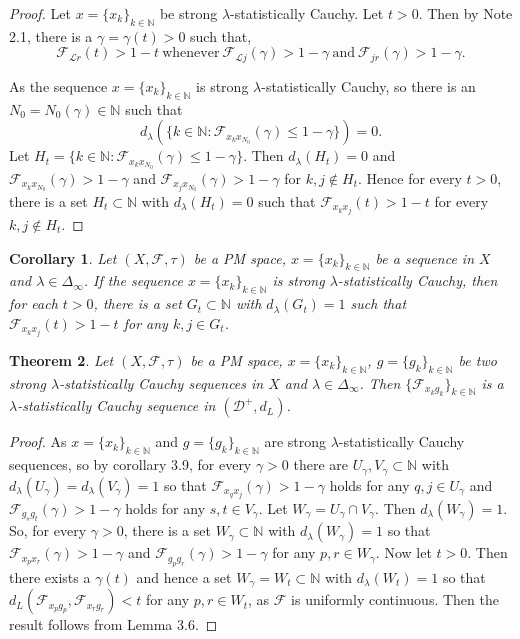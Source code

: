 \documentclass[reqno,b5paper]{amsart}
\theoremstyle{plain}
\newtheorem{thm}{Theorem}[section]
\newtheorem{cor}[thm]{Corollary}
\theoremstyle{definition}
\begin{document}
\begin{proof}
Let $x=\{x_k\}_{k \in \mathbb{N}}$ be strong
$\lambda$-statistically Cauchy. Let $t>0$. Then by Note 2.1, there
is a $\gamma=\gamma(t)>0$ such that,
$$\mathcal{F}_{\mathcal{L}r}(t)>1-t ~\text{whenever}~ \mathcal{F}_{\mathcal{L}j}(\gamma)>1-\gamma ~\text{and}~ \mathcal{F}_{jr}(\gamma)>1-\gamma.$$

As the sequence $x=\{x_k\}_{k \in \mathbb{N}}$ is strong
$\lambda$-statistically Cauchy, so there is an
$N_0=N_0(\gamma)\in\mathbb{N}$ such that
$$d_\lambda(\{k\in \mathbb{N}:\mathcal{F}_{x_kx_{N_0}}(\gamma)\leq 1-\gamma\})=0.$$
Let $H_t=\{k\in \mathbb{N}:\mathcal{F}_{x_kx_{N_0}}(\gamma)\leq
1-\gamma\}$. Then $d_\lambda(H_t)=0$ and
$\mathcal{F}_{x_kx_{N_0}}(\gamma)>1-\gamma$ and
$\mathcal{F}_{x_jx_{N_0}}(\gamma)>1-\gamma$ for $k,j\notin H_t$.
Hence for every $t>0$, there is a set $H_t\subset\mathbb{N}$ with
$d_\lambda(H_t)=0$ such that $\mathcal{F}_{x_kx_j}(t)>1-t$ for
every $k,j\notin H_t$.
\end{proof}
\begin{cor}
Let $(X,\mathcal{F},\tau)$ be a PM space, $x=\{x_k\}_{k \in
\mathbb{N}}$ be a sequence in $X$ and $\lambda\in\Delta_\infty$.
If the sequence $x=\{x_k\}_{k \in \mathbb{N}}$ is strong
$\lambda$-statistically Cauchy, then for each $t>0$, there is a
set $G_t\subset \mathbb{N}$ with $d_\lambda(G_t)=1$ such that
$\mathcal{F}_{x_kx_j}(t)>1-t$ for any $k,j\in G_t$.
\end{cor}
\begin{thm}
Let $(X,\mathcal{F},\tau)$ be a PM space, $x=\{x_k\}_{k \in
\mathbb{N}}$, $g=\{g_k\}_{k\in\mathbb{N}}$ be two strong
$\lambda$-statistically Cauchy sequences in $X$ and
$\lambda\in\Delta_\infty$. Then
$\{\mathcal{F}_{{x_k}{g_k}}\}_{k\in\mathbb{N}}$ is a
$\lambda$-statistically Cauchy sequence in $(\mathcal{D}^+,d_L)$.
\end{thm}
\begin{proof}
As $x=\{x_k\}_{k \in \mathbb{N}}$ and $g=\{g_k\}_{k\in\mathbb{N}}$
are strong $\lambda$-statistically Cauchy sequences, so by
corollary 3.9, for every $\gamma>0$ there are $U_\gamma,
V_\gamma\subset\mathbb{N}$ with
$d_\lambda(U_\gamma)=d_\lambda(V_\gamma)=1$ so that
$\mathcal{F}_{x_qx_j}(\gamma)>1-\gamma$ holds for any $q,j\in
U_\gamma$ and $\mathcal{F}_{g_sg_t}(\gamma)>1-\gamma$ holds for
any $s,t\in V_\gamma$. Let $W_\gamma=U_\gamma\cap V_\gamma$. Then
$d_\lambda(W_\gamma)=1$. So, for every $\gamma>0$, there is a set
$W_\gamma\subset\mathbb{N}$ with $d_\lambda(W_\gamma)=1$ so that
$\mathcal{F}_{x_px_r}(\gamma)>1-\gamma$ and
$\mathcal{F}_{g_pg_r}(\gamma)>1-\gamma$ for any $p,r\in W_\gamma$.
Now let $t>0$. Then there exists a $\gamma(t)$ and hence a set
$W_\gamma=W_t\subset\mathbb{N}$ with $d_\lambda(W_t)=1$ so that
$d_L(\mathcal{F}_{x_pg_p},\mathcal{F}_{x_rg_r})<t$ for any $p,r\in
W_t$, as $\mathcal{F}$ is uniformly continuous. Then the result
follows from Lemma 3.6.
\end{proof}
\end{document}
